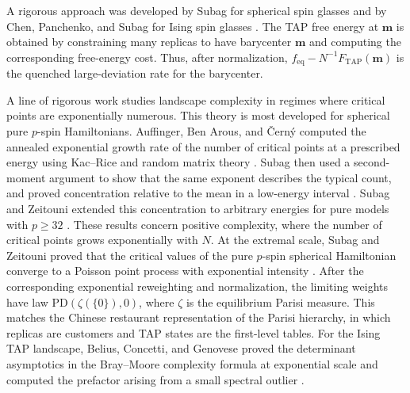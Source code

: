 \documentclass[a4paper,10pt,reqno]{amsart}
\numberwithin{equation}{section}
\newcommand{\TAP}{\mathrm{TAP}}
\newcommand{\eq}{\mathrm{eq}}
\newcommand{\bfm}{\mathbf{m}}
\begin{document}
	A rigorous approach was developed by Subag for spherical spin glasses and by
	Chen, Panchenko, and Subag for Ising spin glasses
	\cite{Subag2018,ChenPanchenkoSubag,ChenPanchenkoSubag2}. The TAP free energy
	at \(\bfm\) is obtained by constraining many replicas to have barycenter
	\(\bfm\) and computing the corresponding free-energy cost. Thus, after
	normalization, \(f_{\eq}-N^{-1}F_{\TAP}(\bfm)\) is the quenched
	large-deviation rate for the barycenter.
	
	A line of rigorous work studies landscape complexity in regimes
	where critical points are exponentially numerous. This theory is most
	developed for spherical pure \(p\)-spin Hamiltonians. Auffinger, Ben Arous,
	and \v{C}ern\'y computed the annealed exponential growth rate of the number
	of critical points at a prescribed energy using Kac--Rice and random matrix
	theory \cite{AuffingerBenArousCerny}. Subag then used a second-moment argument
	to show that the same exponent describes the typical count, and proved
	concentration relative to the mean in a low-energy interval
	\cite{SubagComplexity}. Subag and Zeitouni extended this concentration to
	arbitrary energies for pure models with \(p\ge32\)
	\cite{SubagZeitouniComplexity}. These results concern positive complexity,
	where the number of critical points grows exponentially with \(N\). At the
	extremal scale, Subag and Zeitouni proved that the critical values of the pure
	\(p\)-spin spherical Hamiltonian converge to a Poisson point process with
	exponential intensity \cite{SubagZeitouniExtremal}. After the corresponding
	exponential reweighting and normalization, the limiting weights have law
	\(\mathrm{PD}(\zeta(\{0\}),0)\), where \(\zeta\) is the equilibrium Parisi
	measure. This matches the Chinese restaurant representation of the Parisi
	hierarchy, in which replicas are customers and TAP states are the first-level
	tables. For the Ising TAP
	landscape, Belius, Concetti, and Genovese proved the determinant
	asymptotics in the Bray--Moore complexity formula at exponential scale and
	computed the prefactor arising from a small spectral outlier
	\cite{BeliusConcettiGenovese}.
	
\end{document}
